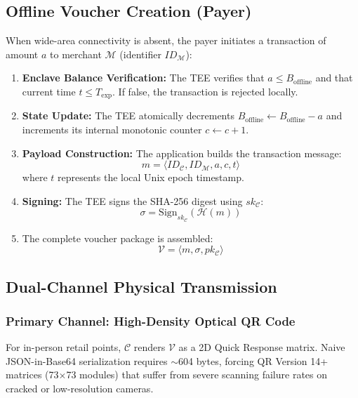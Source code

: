 \documentclass[conference]{IEEEtran}
\begin{document}
\subsection{Offline Voucher Creation (Payer)}
When wide-area connectivity is absent, the payer initiates a transaction of amount $a$ to merchant $\mathcal{M}$ (identifier $ID_{\mathcal{M}}$):
\begin{enumerate}
    \item \textbf{Enclave Balance Verification:} The TEE verifies that $a \le B_{\text{offline}}$ and that current time $t \le T_{\text{exp}}$. If false, the transaction is rejected locally.
    \item \textbf{State Update:} The TEE atomically decrements $B_{\text{offline}} \leftarrow B_{\text{offline}} - a$ and increments its internal monotonic counter $c \leftarrow c + 1$.
    \item \textbf{Payload Construction:} The application builds the transaction message:
    \begin{equation}
    m = \langle ID_{\mathcal{C}}, ID_{\mathcal{M}}, a, c, t \rangle
    \end{equation}
    where $t$ represents the local Unix epoch timestamp.
    \item \textbf{Signing:} The TEE signs the SHA-256 digest using $sk_{\mathcal{C}}$:
    \begin{equation}
    \sigma = \text{Sign}_{sk_{\mathcal{C}}}(\mathcal{H}(m))
    \end{equation}
    \item The complete voucher package is assembled:
    \begin{equation}
    \mathcal{V} = \langle m, \sigma, pk_{\mathcal{C}} \rangle
    \end{equation}
\end{enumerate}

\subsection{Dual-Channel Physical Transmission}

\subsubsection{Primary Channel: High-Density Optical QR Code}
For in-person retail points, $\mathcal{C}$ renders $\mathcal{V}$ as a 2D Quick Response matrix. Naive JSON-in-Base64 serialization requires $\sim$604 bytes, forcing QR Version 14+ matrices (73$\times$73 modules) that suffer from severe scanning failure rates on cracked or low-resolution cameras.
\end{document}
